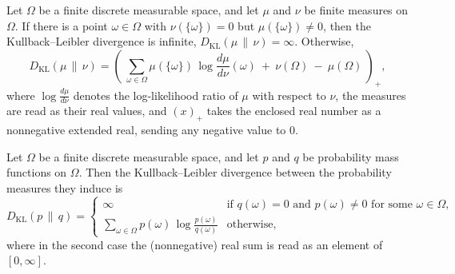 \begin{theorem}
\label{CommunicationComplexity.FiniteMeasureSpace.klDiv_eq_sum_llr}
\leanok
{}
Let $\Omega$ be a finite discrete measurable space, and let $\mu$ and $\nu$ be finite
measures on $\Omega$. If there is a point $\omega \in \Omega$ with $\nu(\{\omega\}) = 0$
but $\mu(\{\omega\}) \neq 0$, then the Kullback–Leibler divergence is infinite,
$D_{\mathrm{KL}}(\mu \,\|\, \nu) = \infty$. Otherwise,
\[
  D_{\mathrm{KL}}(\mu \,\|\, \nu)
= \left(\ \sum_{\omega \in \Omega} \mu(\{\omega\})\,\log\frac{d\mu}{d\nu}(\omega)\ +\
\nu(\Omega)\ -\ \mu(\Omega)\ \right)_{\!+},
\]
where $\log\frac{d\mu}{d\nu}$ denotes the log-likelihood ratio of $\mu$ with respect to
$\nu$, the measures are read as their real values, and $(x)_+$ takes the enclosed real
number as a nonnegative extended real, sending any negative value to $0$.
\end{theorem}

\begin{theorem}
\label{CommunicationComplexity.FiniteMeasureSpace.pmf_klDiv_eq_sum_llr}
\leanok
{}
\difficulty{3}
Let $\Omega$ be a finite discrete measurable space, and let $p$ and $q$ be probability
mass functions on $\Omega$. Then the Kullback–Leibler divergence between the probability
measures they induce is
\[
  D_{\mathrm{KL}}(p \,\|\, q) =
  \begin{cases}
\infty & \text{if } q(\omega) = 0 \text{ and } p(\omega) \neq 0 \text{ for some } \omega
\in \Omega, \\[4pt]
\displaystyle\sum_{\omega \in \Omega} p(\omega)\,\log\!\frac{p(\omega)}{q(\omega)} &
\text{otherwise,}
  \end{cases}
\]
where in the second case the (nonnegative) real sum is read as an element of
$[0,\infty]$.
\end{theorem}

